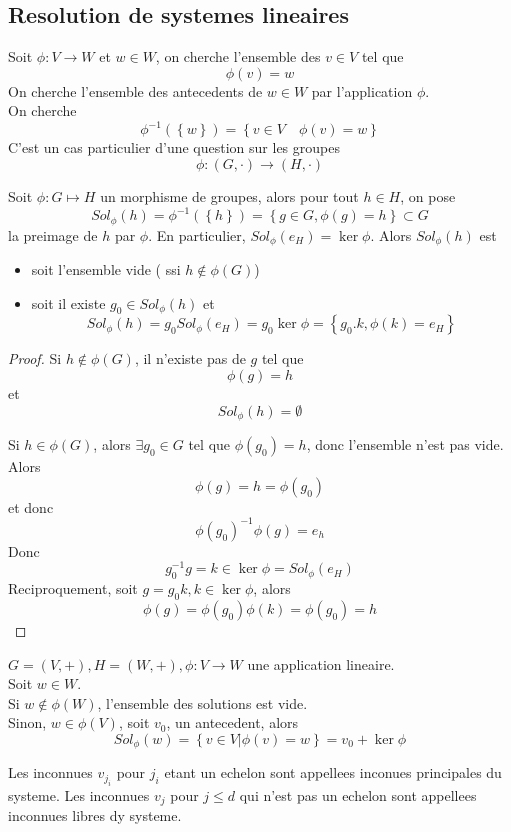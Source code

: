 \documentclass[../main.tex]{subfiles}
\begin{document}
\subsection{Resolution de systemes lineaires}
Soit $\phi: V \to W$ et $w \in W$, on cherche l'ensemble des $v \in V$ tel que
\[ 
	\phi( v) = w
\]
On cherche l'ensemble des antecedents de $w \in W $ par l'application $\phi$.\\
On cherche 
\[ 
	\phi^{-1}( \left\{ w \right\} ) = \left\{ v \in V \quad \phi( v) = w \right\} 
\]
C'est un cas particulier d'une question sur les groupes
\[ 
	\phi: ( G, \cdot) \to ( H,\cdot) 
\]
\begin{lemma}
Soit $\phi: G \mapsto H$ un morphisme de groupes, alors pour tout $h \in H$, on pose
\[ 
	Sol_\phi( h) = \phi ^{-1}(  \left\{ h \right\} ) = \left\{ g \in G, \phi( g) =h \right\} \subset G
\]
la preimage de $h$ par $\phi$. En particulier, $Sol_\phi( e_H) = \ker \phi$. Alors $Sol_\phi( h) $ est
\begin{itemize}
	\item soit l'ensemble vide ( ssi $h \notin \phi( G) $) 
	\item soit il existe $g_0\in Sol_\phi( h) $ et
		\[ 
			Sol_\phi( h) = g_0Sol_\phi( e_H) = g_0\ker \phi = \left\{ g_0.k, \phi( k) =e_H \right\} 
		\]
		
\end{itemize}


\end{lemma}

\begin{proof}
	Si $h \notin \phi( G) $, il n'existe pas de $g$ tel que
	\[ 
		\phi( g) =h 
	\]
	et 
	\[ 
		Sol_\phi( h) = \emptyset
	\]
	
	Si $h \in \phi( G) $, alors $\exists g_0 \in G $ tel que $\phi( g_0) =h$,
	donc l'ensemble n'est pas vide.\\
	Alors
	\[ 
		\phi( g) =h = \phi( g_0) 
	\]
	et donc
	\[ 
		\phi( g_0) ^{-1}\phi( g) = e_h
	\]
	Donc
	\[ 
		g_0^{-1}g = k \in \ker \phi = Sol_\phi( e_H) 
	\]
	Reciproquement, soit $g= g_0k, k \in \ker \phi$, alors
	\[ 
		\phi( g) = \phi( g_0) \phi( k) = \phi( g_0) = h
	\]
	
	
\end{proof}
\begin{crly}
	$G= ( V,+) , H = ( W,+) , \phi: V \to W$ une application lineaire.\\
	Soit $w \in W$.\\
	Si $w \notin \phi( W) $, l'ensemble des solutions est vide.\\
	Sinon, $w \in \phi( V) $, soit $v_0$, un antecedent, alors
	\[ 
		Sol_\phi( w) = \left\{ v \in V | \phi( v) = w \right\} = v_0 + \ker \phi
	\]
	
\end{crly}
\begin{defn}
Les inconnues $v_{j_i} $ pour $j_i$ etant un echelon sont appellees inconues principales du systeme. Les inconnues $v_j$ pour $j\leq d$ qui n'est pas un echelon sont appellees inconnues libres dy systeme.
\end{defn}


	
\end{document}
